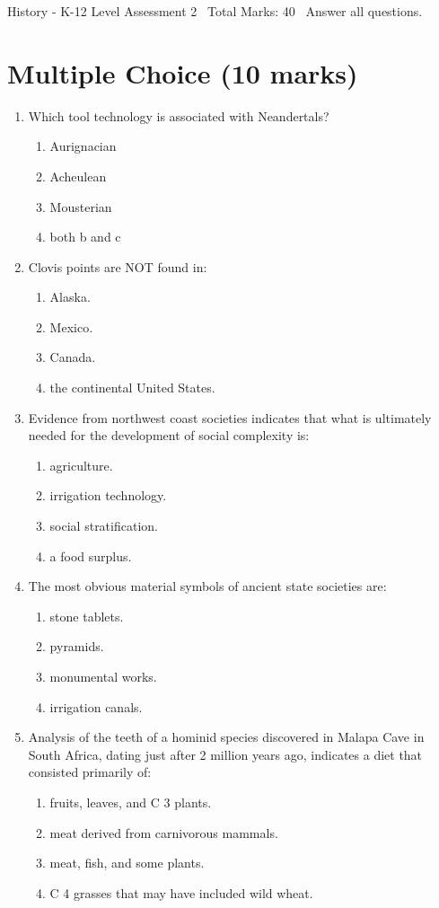 \documentclass[12pt]{article}
\begin{document}
\begin{center}
History - K-12 Level Assessment 2 \
Total Marks: 40 \
Answer all questions.
\end{center}

\section*{Multiple Choice (10 marks)}
\begin{enumerate}[label=\arabic*.]
\item Which tool technology is associated with Neandertals?
\begin{enumerate}[label=(\alph*)]
    \item Aurignacian
    \item Acheulean
    \item Mousterian
    \item both b and c
\end{enumerate}
\item Clovis points are NOT found in:
\begin{enumerate}[label=(\alph*)]
    \item Alaska.
    \item Mexico.
    \item Canada.
    \item the continental United States.
\end{enumerate}
\item Evidence from northwest coast societies indicates that what is ultimately needed for the development of social complexity is:
\begin{enumerate}[label=(\alph*)]
    \item agriculture.
    \item irrigation technology.
    \item social stratification.
    \item a food surplus.
\end{enumerate}
\item The most obvious material symbols of ancient state societies are:
\begin{enumerate}[label=(\alph*)]
    \item stone tablets.
    \item pyramids.
    \item monumental works.
    \item irrigation canals.
\end{enumerate}
\item Analysis of the teeth of a hominid species discovered in Malapa Cave in South Africa, dating just after 2 million years ago, indicates a diet that consisted primarily of:
\begin{enumerate}[label=(\alph*)]
    \item fruits, leaves, and C 3 plants.
    \item meat derived from carnivorous mammals.
    \item meat, fish, and some plants.
    \item C 4 grasses that may have included wild wheat.
\end{enumerate}
\end{enumerate}
\end{document}

